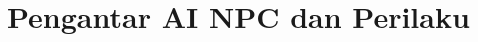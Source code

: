 \documentclass[../../main.tex]{subfiles}
\begin{document}
\chapter{Pengantar AI NPC dan Perilaku }
\label{chap:perilaku-chase}
























\ifSubfilesClassLoaded{%
  \clearpage
}{}
\end{document}
